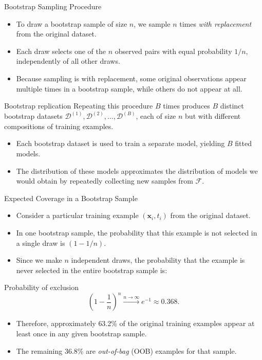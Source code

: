 \begin{frame}{Bootstrap Sampling Procedure}
  \begin{itemize}
    \item To draw a \alert{bootstrap sample} of size $n$, we sample $n$ times \emph{with replacement}
          from the original dataset.
    \item Each draw selects one of the $n$ observed pairs with equal probability $1/n$,
          independently of all other draws.
    \item Because sampling is \alert{with replacement}, some original observations appear
          multiple times in a bootstrap sample, while others do not appear at all.
  \end{itemize}
  \begin{block}{Bootstrap replication}
    Repeating this procedure $B$ times produces $B$ distinct bootstrap datasets
    $\mathcal{D}^{(1)}, \mathcal{D}^{(2)}, \ldots, \mathcal{D}^{(B)}$, each of size $n$ but
    with different compositions of training examples.
  \end{block}
  \begin{itemize}
    \item Each bootstrap dataset is used to train a separate model, yielding $B$ fitted models.
    \item The distribution of these models approximates the distribution of models we would
          obtain by repeatedly collecting new samples from $\mathcal{F}$.
  \end{itemize}
\end{frame}

\begin{frame}{Expected Coverage in a Bootstrap Sample}
  \begin{itemize}
    \item Consider a particular training example $(\mathbf{x}_i, t_i)$ from the original dataset.
    \item In one bootstrap sample, the probability that this example is \alert{not selected}
          in a single draw is $(1 - 1/n)$.
    \item Since we make $n$ independent draws, the probability that the example is never
          selected in the entire bootstrap sample is:
  \end{itemize}
  \begin{block}{Probability of exclusion}
    \[
    \left(1 - \frac{1}{n}\right)^n \xrightarrow{n \to \infty} e^{-1} \approx 0.368.
    \]
  \end{block}
  \begin{itemize}
    \item Therefore, approximately \alert{63.2\%} of the original training examples appear
          at least once in any given bootstrap sample.
    \item The remaining \alert{36.8\%} are \emph{out-of-bag} (OOB) examples for that sample.
  \end{itemize}
\end{frame}

